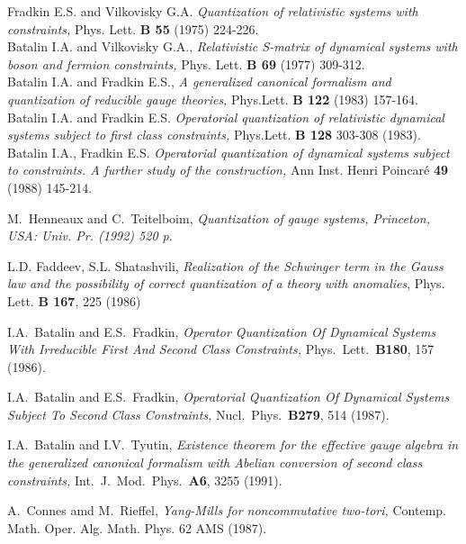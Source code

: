 \documentclass[a4paper,11pt,oneside]{amsart}
\theoremstyle{plain}
\numberwithin{equation}{section} %
\numberwithin{figure}{section} %
\begin{document}
\begin{thebibliography}{33}

\bibitem{[BFV]}
         Fradkin E.S. and Vilkovisky G.A. {\em Quantization
         of relativistic systems with
         constraints,}  Phys. Lett. {\bf B 55} (1975) 224-226.  \\
         Batalin I.A. and  Vilkovisky G.A.,
         {\em Relativistic S-matrix of dynamical systems with boson
         and fermion constraints,}
         Phys. Lett. {\bf B 69} (1977) 309-312.          \\
         Batalin I.A. and Fradkin E.S.,
                                 {\em  A generalized canonical formalism and quantization of
         reducible gauge theories,}
           Phys.Lett. {\bf B 122 }     (1983) 157-164.   \\
         Batalin I.A. and Fradkin E.S.
         {\em Operatorial quantization of relativistic dynamical systems
         subject to first class constraints,}
         Phys.Lett. {\bf B 128} 303-308 (1983).             \\
         Batalin I.A., Fradkin E.S.
         {\em Operatorial quantization of dynamical systems subject to
         constraints. A further study of the construction,}
         Ann Inst. Henri Poincar\'e  {\bf 49} (1988) 145-214.


\bibitem{[HT]} M.~Henneaux and C.~Teitelboim,
{\em Quantization of gauge systems,}
{\it  Princeton, USA: Univ. Pr. (1992) 520 p}.




\bibitem{[FSh]} L.D. Faddeev, S.L. Shatashvili, {\em Realization of the
Schwinger term in the Gauss law and the possibility of
correct quantization of a theory with anomalies},
 Phys. Lett. {\bf B 167}, 225 (1986)

\bibitem{[BF]} I.A.~Batalin and E.S.~Fradkin,
{\em Operator Quantization Of Dynamical Systems With Irreducible
First And Second Class Constraints,} Phys.\ Lett.\ {\bf B180}, 157 (1986).

\bibitem{[BF87]} I.A.~Batalin and E.S.~Fradkin, {\em
Operatorial Quantization Of Dynamical Systems Subject To Second Class
Constraints,} Nucl.\ Phys.\ {\bf B279}, 514 (1987).

\bibitem{[BT]} I.A.~Batalin and I.V.~Tyutin, {\em
Existence theorem for the effective gauge algebra in the generalized
        canonical formalism with Abelian conversion of second class
        constraints,} Int.\ J.\ Mod.\ Phys.\ {\bf A6}, 3255 (1991).

\bibitem{[Connes]} A.~Connes amd M.~Rieffel, {\em Yang-Mills for
noncommutative two-tori,} Contemp. Math. Oper. Alg. Math. Phys. 62
AMS (1987).




\end{thebibliography}
\end{document}

